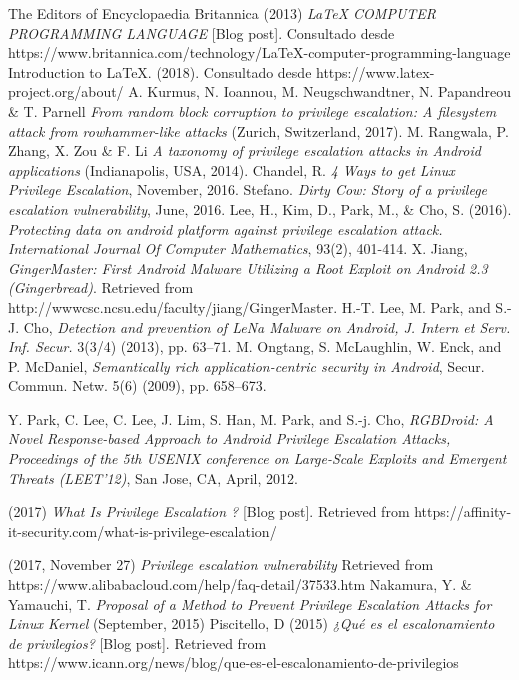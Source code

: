 \documentclass[letterpaper, 10pt, journal]{IEEEtran}
\begin{document}
\begin{thebibliography}{1}
\bibitem{[1]}The Editors of Encyclopaedia Britannica  (2013) \emph{LaTeX COMPUTER PROGRAMMING LANGUAGE} [Blog post]. Consultado desde https://www.britannica.com/technology/LaTeX-computer-programming-language
 Introduction to LaTeX. (2018). Consultado desde https://www.latex-project.org/about/
A. Kurmus, N. Ioannou, M. Neugschwandtner, N. Papandreou \& T. Parnell \emph{From random block corruption to privilege escalation: A filesystem attack from rowhammer-like attacks} (Zurich, Switzerland, 2017).
 M. Rangwala, P. Zhang, X. Zou \& F. Li \emph{A taxonomy of privilege escalation attacks in Android applications} (Indianapolis, USA, 2014).
 Chandel, R. \emph{4 Ways to get Linux Privilege Escalation}, November, 2016.
 Stefano. \emph{Dirty Cow: Story of a privilege escalation vulnerability}, June, 2016.
Lee, H., Kim, D., Park, M., & Cho, S. (2016).  \emph{Protecting data on android platform against privilege escalation attack. International Journal Of Computer Mathematics}, 93(2), 401-414.
 X. Jiang,\emph{ GingerMaster: First Android Malware Utilizing a Root Exploit on Android 2.3 (Gingerbread)}.  Retrieved from http://wwwcsc.ncsu.edu/faculty/jiang/GingerMaster. 
 H.-T. Lee, M. Park, and S.-J. Cho,\emph{ Detection and prevention of LeNa Malware on Android, J. Intern et Serv. Inf.
Secur.} 3(3/4) (2013), pp. 63–71. 
 M. Ongtang, S. McLaughlin, W. Enck, and P. McDaniel, \emph{Semantically rich application-centric security in Android},
Secur. Commun. Netw. 5(6) (2009), pp. 658–673.

 Y. Park, C. Lee, C. Lee, J. Lim, S. Han, M. Park, and S.-j. Cho, \emph{RGBDroid: A Novel Response-based Approach
to Android Privilege Escalation Attacks, Proceedings of the 5th USENIX conference on Large-Scale Exploits and
Emergent Threats (LEET’12)}, San Jose, CA, April, 2012.

 (2017) \emph{What Is Privilege Escalation ?} [Blog post]. Retrieved from https://affinity-it-security.com/what-is-privilege-escalation/

 (2017, November 27) \emph{Privilege escalation vulnerability} Retrieved from https://www.alibabacloud.com/help/faq-detail/37533.htm
 Nakamura, Y. \& Yamauchi, T. \emph{Proposal of a Method to Prevent Privilege Escalation Attacks for Linux Kernel} (September, 2015)
 Piscitello, D (2015) \emph{¿Qu\'e es el escalonamiento de privilegios?} [Blog post]. Retrieved from https://www.icann.org/news/blog/que-es-el-escalonamiento-de-privilegios


\end{thebibliography}
\end{document}
